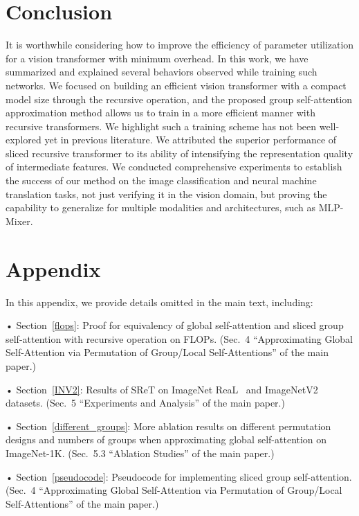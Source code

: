 \documentclass[runningheads]{llncs}
\begin{document}
	\section{Conclusion}
	
	It is worthwhile considering how to improve the efficiency of parameter utilization for a vision transformer with minimum overhead. In this work, we have summarized and explained several behaviors observed while training such networks. We focused on building an efficient vision transformer with a compact model size through the recursive operation, and the proposed group self-attention approximation method allows us to train in a more efficient manner with recursive transformers. We highlight such a training scheme has not been well-explored yet in previous literature. 
	We attributed the superior performance of sliced recursive transformer to its ability of intensifying the representation quality of intermediate features. 
	We conducted comprehensive experiments to establish the success of our method on the image classification and neural machine translation tasks, not just verifying it in the vision domain, but proving the capability to generalize for multiple modalities and architectures, such as MLP-Mixer.
	
		\appendix
	
	\section*{\Large{Appendix}}
	
	In this appendix, we provide details omitted in the main text, including:
	
	• Section~\ref{flops}: Proof for equivalency of global self-attention and sliced group self-attention with recursive operation on FLOPs. (Sec.~4 ``Approximating Global Self-Attention via Permutation of Group/Local Self-Attentions'' of the main paper.)
	
	• Section~\ref{INV2}: Results of SReT on ImageNet ReaL~\cite{beyer2020we} and ImageNetV2~\cite{recht2019imagenet} datasets. (Sec.~5 ``Experiments and Analysis'' of the main paper.)
	
	• Section~\ref{different_groups}: More ablation results on different permutation designs and numbers of groups when approximating global self-attention on ImageNet-1K. (Sec.~5.3 ``Ablation Studies'' of the main paper.)
	
	• Section~\ref{pseudocode}: Pseudocode for implementing sliced group self-attention. (Sec.~4 ``Approximating Global Self-Attention via Permutation of Group/Local Self-Attentions'' of the main paper.)
	
\end{document}
